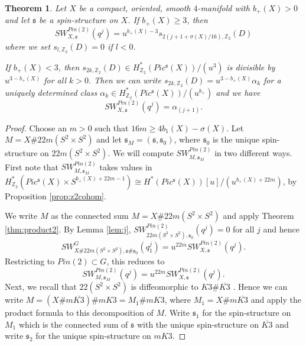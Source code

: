 \documentclass{amsart}
\newtheorem{theorem}{Theorem}[section]
\theoremstyle{definition}
\theoremstyle{remark}
\numberwithin{equation}{section}
\begin{document}
\begin{theorem}\label{thm:swpin1}
Let $X$ be a compact, oriented, smooth $4$-manifold with $b_+(X) > 0$ and let $\mathfrak{s}$ be a spin-structure on $X$. If $b_+(X) \ge 3$, then
\[
SW^{Pin(2)}_{X,\mathfrak{s}}( q^j ) = u^{b_+(X)-3} s_{2(j+1+\sigma(X)/16) , \mathbb{Z}_2}(D)
\]
where we set $s_{l,\mathbb{Z}_2}(D) = 0$ if $l < 0$.

If $b_+(X) < 3$, then $s_{2k , \mathbb{Z}_2}(D) \in H^*_{\mathbb{Z}_2}( Pic^{\mathfrak{s}}(X) )/(u^3)$ is divisible by $u^{3-b_+(X)}$ for all $k>0$. Then we can write $s_{2k , \mathbb{Z}_2}(D) = u^{3-b_+(X)} \alpha_k$ for a uniquely determined class $\alpha_k \in H^*_{\mathbb{Z}_2}(Pic^{\mathfrak{s}}(X))/(u^{b_+})$ and we have
\[
SW^{Pin(2)}_{X,\mathfrak{s}}( q^j ) = \alpha_{(j+1)}.
\]
\end{theorem}
\begin{proof}
Choose an $m > 0$ such that $16m \ge 4b_1(X) - \sigma(X)$. Let $M = X \# 22m(S^2 \times S^2)$ and let $\mathfrak{s}_M = (\mathfrak{s} , \mathfrak{s}_0)$, where $\mathfrak{s}_0$ is the unique spin-structure on $22m(S^2 \times S^2)$. We will compute $SW^{Pin(2)}_{M,\mathfrak{s}_M}$ in two different ways. First note that $SW^{Pin(2)}_{M , \mathfrak{s}_M}$ takes values in $H^*_{\mathbb{Z}_2}( Pic^{\mathfrak{s}}(X) \times S^{b_+(X)+22m-1} ) \cong H^*( Pic^{\mathfrak{s}}(X) )[u]/( u^{b_+(X)+22m})$, by Proposition \ref{prop:z2cohom}.

We write $M$ as the connected sum $M = X \# 22m(S^2 \times S^2)$ and apply Theorem \ref{thm:product2}. By Lemma \ref{lem:j}, $SW^{Pin(2)}_{22m(S^2 \times S^2) , \mathfrak{s}_0}(q^j) = 0$ for all $j$ and hence
\[
SW^{G}_{X \# 22m(S^2 \times S^2) , \mathfrak{s} \# \mathfrak{s}_0}(q_1^j) = u^{22m} SW^{Pin(2)}_{X , \mathfrak{s}}( q^j ).
\]
Restricting to $Pin(2) \subset G$, this reduces to
\begin{equation}\label{equ:swm1}
SW^{Pin(2)}_{M , \mathfrak{s}_M}(q^j) = u^{22m} SW^{Pin(2)}_{X , \mathfrak{s}}(q^j).
\end{equation}
Next, we recall that $22(S^2 \times S^2)$ is diffeomorphic to $K3 \# \overline{K3}$ \cite{gom}. Hence we can write $M = (X \# m\overline{K3}) \# mK3 = M_1 \# mK3$, where $M_1 = X \# m\overline{K3}$ and apply the product formula to this decomposition of $M$. Write $\mathfrak{s}_1$ for the spin-structure on $M_1$ which is the connected sum of $\mathfrak{s}$ with the unique spin-structure on $\overline{K3}$ and write $\mathfrak{s}_2$ for the unique spin-structure on $mK3$. 


\end{proof}
\end{document}
